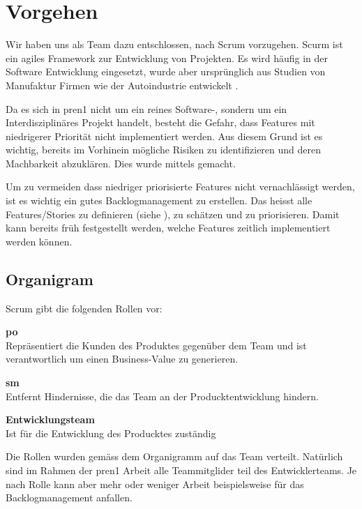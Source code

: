 \section{Vorgehen}

Wir haben uns als Team dazu entschlossen, nach Scrum \cite{Wikipedia-Scrum} vorzugehen.
Scurm ist ein agiles Framework zur Entwicklung von Projekten. Es wird häufig in der 
Software Entwicklung eingesetzt, wurde aber ursprünglich aus Studien von Manufaktur
Firmen wie der Autoindustrie entwickelt \cite{Wikipedia-Scrum-History}.

Da es sich in \acrshort{pren}1 nicht um ein reines Software-, sondern um
ein Interdisziplinäres Projekt handelt, besteht die Gefahr, dass Features
mit niedrigerer Priorität nicht implementiert werden. Aus diesem Grund ist es
wichtig, bereits im Vorhinein mögliche Risiken zu identifizieren und deren Machbarkeit
abzuklären. Dies wurde mittels  gemacht.

Um zu vermeiden dass niedriger priorisierte Features nicht vernachlässigt werden,
ist es wichtig ein gutes Backlogmanagement zu erstellen. Das heisst alle Features/Stories
zu definieren (siehe ), zu schätzen und zu priorisieren.
Damit kann bereits früh festgestellt werden, welche Features zeitlich implementiert werden 
können.

\subsection{Organigram}

Scrum gibt die folgenden Rollen vor:

\begin{items}
  \item {\bf \acrfull{po}} \\
    Repräsentiert die Kunden des Produktes gegenüber dem Team 
    und ist verantwortlich um einen Business-Value zu generieren.
  \item {\bf \acrfull{sm}} \\
    Entfernt Hindernisse, die das Team an der Producktentwicklung hindern.
  \item {\bf Entwicklungsteam} \\
    Ist für die Entwicklung des Producktes zuständig
\end{items}

Die Rollen wurden gemäss dem Organigramm auf das Team verteilt. Natürlich sind 
im Rahmen der \acrshort{pren}1 Arbeit alle Teammitglider teil des Entwicklerteams.
Je nach Rolle kann aber mehr oder weniger Arbeit beispielsweise für das Backlogmanagement anfallen.

